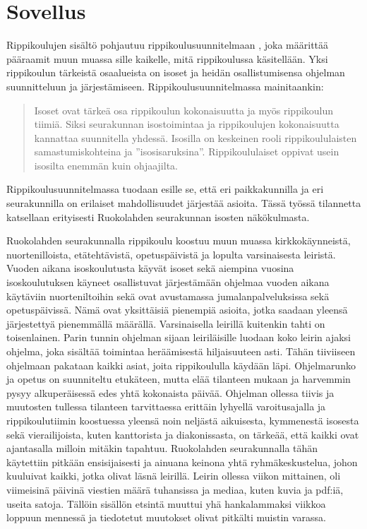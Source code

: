 \chapter{Sovellus}
\label{ch:sovellus}

Rippikoulujen sisältö pohjautuu rippikoulusuunnitelmaan
\parencite{evlSuuriIhmeRippikoulusuunnitelma2017}, joka määrittää pääraamit
muun muassa sille kaikelle, mitä rippikoulussa käsitellään. Yksi rippikoulun
tärkeistä osaalueista on isoset ja heidän osallistumisensa ohjelman
suunnitteluun ja järjestämiseen. Rippikoulusuunnitelmassa
\parencite{evlSuuriIhmeRippikoulusuunnitelma2017} mainitaankin:

\begin{quotation}
    \noindent Isoset ovat tärkeä osa rippikoulun kokonaisuutta ja myös
    rippikoulun tiimiä. Siksi seurakunnan isostoimintaa ja rippikoulujen
    kokonaisuutta kannattaa suunnitella yhdessä. Isosilla on keskeinen rooli
    rippikoululaisten samastumiskohteina ja ”isosisaruksina”. Rippikoululaiset
    oppivat usein isosilta enemmän kuin ohjaajilta.
\end{quotation}

Rippikoulusuunnitelmassa tuodaan esille se, että eri paikkakunnilla ja eri
seurakunnilla on erilaiset mahdollisuudet järjestää asioita. Tässä työssä
tilannetta katsellaan erityisesti Ruokolahden seurakunnan isosten näkökulmasta.

Ruokolahden seurakunnalla rippikoulu koostuu muun muassa kirkkokäynneistä,
nuortenilloista, etätehtävistä, opetuspäivistä ja lopulta varsinaisesta
leiristä. Vuoden aikana isoskoulutusta käyvät isoset sekä aiempina vuosina
isoskoulutuksen käyneet osallistuvat järjestämään ohjelmaa vuoden aikana
käytäviin nuorteniltoihin sekä ovat avustamassa jumalanpalveluksissa sekä
opetuspäivissä. Nämä ovat yksittäisiä pienempiä asioita, jotka saadaan
yleensä järjestettyä pienemmällä määrällä. Varsinaisella leirillä kuitenkin
tahti on toisenlainen. Parin tunnin ohjelman sijaan leiriläisille luodaan koko
leirin ajaksi ohjelma, joka sisältää toimintaa heräämisestä hiljaisuuteen asti.
Tähän tiiviiseen ohjelmaan pakataan kaikki asiat, joita rippikoululla käydään
läpi. Ohjelmarunko ja opetus on suunniteltu etukäteen, mutta elää tilanteen
mukaan ja harvemmin pysyy alkuperäisessä edes yhtä kokonaista päivää. Ohjelman
ollessa tiivis ja muutosten tullessa tilanteen tarvittaessa erittäin lyhyellä
varoitusajalla ja rippikoulutiimin koostuessa yleensä noin neljästä aikuisesta,
kymmenestä isosesta sekä vierailijoista, kuten kanttorista ja diakonissasta,
on tärkeää, että kaikki ovat ajantasalla milloin mitäkin tapahtuu. Ruokolahden
seurakunnalla tähän käytettiin pitkään ensisijaisesti ja ainuana keinona yhtä
ryhmäkeskustelua, johon kuuluivat kaikki, jotka olivat läsnä leirillä. Leirin
ollessa viikon mittainen, oli viimeisinä päivinä viestien määrä tuhansissa ja
mediaa, kuten kuvia ja pdf:iä, useita satoja. Tällöin sisällön etsintä muuttui
yhä hankalammaksi viikkoa loppuun mennessä ja tiedotetut muutokset olivat
pitkälti muistin varassa.

